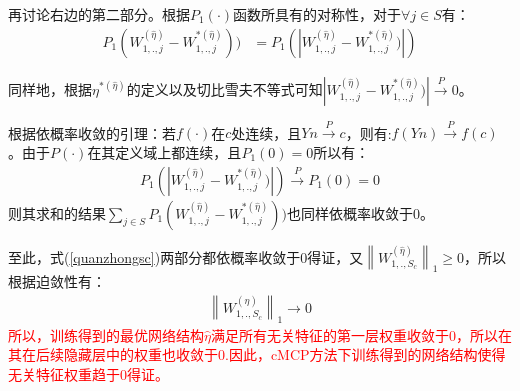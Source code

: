 \documentclass{article}
\begin{document}
\par 再讨论右边的第二部分。根据$P_1(\cdot)$函数所具有的对称性，对于$\forall j\in S$有：
\begin{equation}
	\begin{split}
		P_1(W_{1,.,j}^{(\hat{\eta})}-W_{1,.,j}^{*(\hat{\eta})}))&=P_1(|W_{1,.,j}^{(\hat{\eta})}-W_{1,.,j}^{*(\hat{\eta})})|)
	\end{split}
\end{equation}
\par 同样地，根据$\eta^{*(\hat{\eta})}$的定义以及切比雪夫不等式可知$|W_{1,.,j}^{(\hat{\eta})}-W_{1,.,j}^{*(\hat{\eta})})|\xrightarrow{P}0$。
\par 根据依概率收敛的引理：若$f(\cdot )$在$c$处连续，且$Yn\xrightarrow{P}c$，则有:$f(Yn)\xrightarrow{P}f(c)$。由于$P(\cdot)$在其定义域上都连续，且$P_1(0)=0$所以有：
\begin{equation}
	\begin{split}
		P_1(|W_{1,.,j}^{(\hat{\eta})}-W_{1,.,j}^{*(\hat{\eta})})|)\xrightarrow{P}P_1(0)=0
	\end{split}
\end{equation}
则其求和的结果$\sum_{j\in S}P_1(W_{1,.,j}^{(\hat{\eta})}-W_{1,.,j}^{*(\hat{\eta})}))$也同样依概率收敛于0。
\par 至此，式(\ref*{quanzhongsc})两部分都依概率收敛于0得证，又$\left\|W_{1,.,S_c}^{(\hat{\eta})}\right\|_1\ge0$，所以根据迫敛性有：
\begin{equation}
	\begin{split}
		\left\|W_{1,.,S_c}^{(\hat{\eta})}\right\|_1\longrightarrow 0
	\end{split}
\end{equation}
\textcolor{red}{所以，训练得到的最优网络结构$\hat{\eta}$满足所有无关特征的第一层权重收敛于0，所以在其在后续隐藏层中的权重也收敛于0.因此，cMCP方法下训练得到的网络结构使得无关特征权重趋于0得证。}
\end{document}
